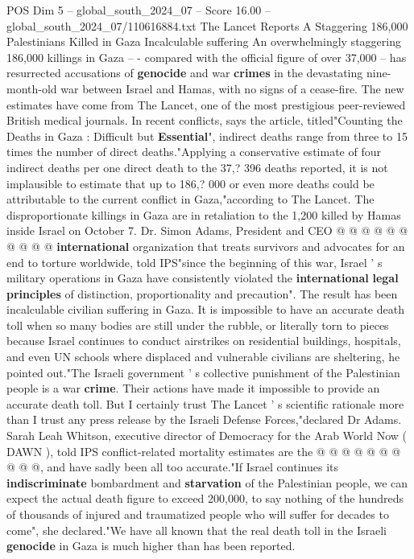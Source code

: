 \begin{textsample}{POS Dim 5 – global\_south\_2024\_07 – Score 16.00 – global\_south\_2024\_07/110616884.txt}  \label{ex:f5_pos_173}
The Lancet Reports A Staggering 186,000 Palestinians Killed in Gaza Incalculable suffering An overwhelmingly staggering 186,000 killings in Gaza -- - compared with the official figure of over 37,000 -- has resurrected accusations of \textbf{genocide} and war \textbf{crimes} in the devastating nine-month-old war between Israel and Hamas, with no signs of a cease-fire.
The new estimates have come from The Lancet, one of the most prestigious peer-reviewed British medical journals.
In recent conflicts, says the article, titled"Counting the Deaths in Gaza : Difficult but \textbf{Essential}", indirect deaths range from three to 15 times the number of direct deaths."Applying a conservative estimate of four indirect deaths per one direct death to the 37,? 396 deaths reported, it is not implausible to estimate that up to 186,? 000 or even more deaths could be attributable to the current conflict in Gaza,"according to The Lancet.
The disproportionate killings in Gaza are in retaliation to the 1,200 killed by Hamas inside Israel on October 7.
Dr.
Simon Adams, President and CEO @ @ @ @ @ @ @ @ @ @ \textbf{international} organization that treats survivors and advocates for an end to torture worldwide, told IPS"since the beginning of this war, Israel ' s military operations in Gaza have consistently violated the \textbf{international} \textbf{legal} \textbf{principles} of distinction, proportionality and precaution".
The result has been incalculable civilian suffering in Gaza.
It is impossible to have an accurate death toll when so many bodies are still under the rubble, or literally torn to pieces because Israel continues to conduct airstrikes on residential buildings, hospitals, and even UN schools where displaced and vulnerable civilians are sheltering, he pointed out."The Israeli government ' s collective punishment of the Palestinian people is a war \textbf{crime}.
Their actions have made it impossible to provide an accurate death toll.
But I certainly trust The Lancet ' s scientific rationale more than I trust any press release by the Israeli Defense Forces,"declared Dr Adams.
Sarah Leah Whitson, executive director of Democracy for the Arab World Now ( DAWN ), told IPS conflict-related mortality estimates are the @ @ @ @ @ @ @ @ @ @, and have sadly been all too accurate."If Israel continues its \textbf{indiscriminate} bombardment and \textbf{starvation} of the Palestinian people, we can expect the actual death figure to exceed 200,000, to say nothing of the hundreds of thousands of injured and traumatized people who will suffer for decades to come", she declared."We have all known that the real death toll in the Israeli \textbf{genocide} in Gaza is much higher than has been reported.

\end{textsample}
